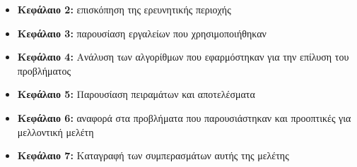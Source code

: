 \begin{itemize}
	\item \textbf{Κεφάλαιο 2:} επισκόπηση της ερευνητικής περιοχής 
	\item \textbf{Κεφάλαιο 3:} παρουσίαση εργαλείων που χρησιμοποιήθηκαν
	\item \textbf{Κεφάλαιο 4:} Ανάλυση των αλγορίθμων που εφαρμόστηκαν για την επίλυση του προβλήματος 
	\item \textbf{Κεφάλαιο 5:} Παρουσίαση πειραμάτων και αποτελέσματα 	
	\item \textbf{Κεφάλαιο 6:} αναφορά στα προβλήματα που παρουσιάστηκαν και προοπτικές για μελλοντική μελέτη
	\item \textbf{Κεφάλαιο 7:} Καταγραφή των συμπερασμάτων αυτής της μελέτης
\end{itemize}

\newpage